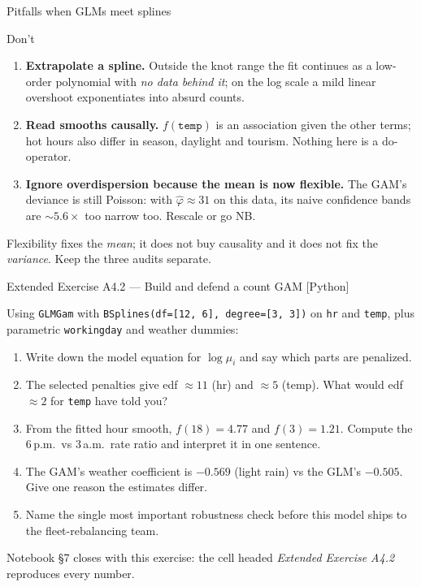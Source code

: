 \documentclass[aspectratio=169,11pt]{beamer}
\begin{document}
\begin{frame}{Pitfalls when GLMs meet splines}
  \begin{alertblock}{Don't}
    \begin{enumerate}
      \item \textbf{Extrapolate a spline.} Outside the knot range the fit continues as
            a low-order polynomial with \emph{no data behind it}; on the log scale a
            mild linear overshoot exponentiates into absurd counts.
      \item \textbf{Read smooths causally.} $f(\texttt{temp})$ is an association given
            the other terms; hot hours also differ in season, daylight and tourism.
            Nothing here is a do-operator.
      \item \textbf{Ignore overdispersion because the mean is now flexible.} The GAM's
            deviance is still Poisson: with $\hat\varphi \approx 31$ on this data, its
            naive confidence bands are $\sim\!5.6\times$ too narrow too. Rescale or go NB.
    \end{enumerate}
  \end{alertblock}
  \begin{takeaway}
    Flexibility fixes the \emph{mean}; it does not buy causality and it does not fix
    the \emph{variance}. Keep the three audits separate.
  \end{takeaway}
\end{frame}

\begin{frame}{Extended Exercise A4.2 --- Build and defend a count GAM [Python]}
\begin{longexercise}
  Using \texttt{GLMGam} with \texttt{BSplines(df=[12, 6], degree=[3, 3])} on
  \texttt{hr} and \texttt{temp}, plus parametric \texttt{workingday} and weather
  dummies:
  \begin{enumerate}
    \item Write down the model equation for $\log\mu_i$ and say which parts are
          penalized.
    \item The selected penalties give edf $\approx 11$ (hr) and $\approx 5$ (temp).
          What would edf $\approx 2$ for \texttt{temp} have told you?
    \item From the fitted hour smooth, $f(18) = 4.77$ and $f(3) = 1.21$. Compute the
          6\,p.m.\ vs 3\,a.m.\ rate ratio and interpret it in one sentence.
    \item The GAM's weather coefficient is $-0.569$ (light rain) vs the GLM's
          $-0.505$. Give one reason the estimates differ.
    \item Name the single most important robustness check before this model ships to
          the fleet-rebalancing team.
  \end{enumerate}
\end{longexercise}
\begin{labnote}
  Notebook \S 7 closes with this exercise: the cell headed \emph{Extended Exercise
  A4.2} reproduces every number.
\end{labnote}
\end{frame}
\end{document}
